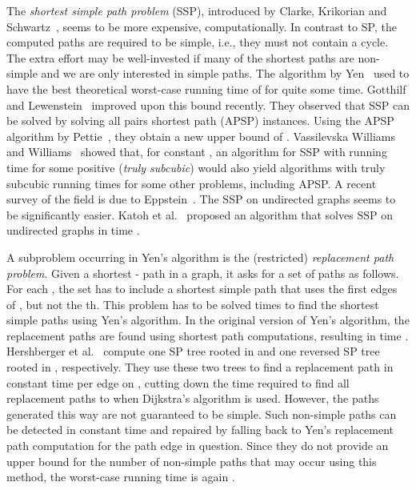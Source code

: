 \documentclass[runningheads,a4paper]{llncs}
\begin{document}
The \emph{ shortest simple path problem} (SSP), introduced by Clarke, Krikorian and Schwartz~\cite{CUSTOM:journals/jsiam/ClarkeKR63}, seems to be more expensive, computationally.
In contrast to SP, the computed paths are required to be simple, i.e., they must not contain a cycle.
The extra effort may be well-invested if many of the  shortest paths are non-simple and we are only interested in simple paths.
The algorithm by Yen~\cite{CUSTOM:journals/networks/Yen71} used to have the best theoretical worst-case running time of  for quite some time.
Gotthilf and Lewenstein~\cite{DBLP:journals/ipl/GotthilfL09} improved upon this bound recently.
They observed that SSP can be solved by solving  all pairs shortest path (APSP) instances.
Using the APSP algorithm by Pettie~\cite{DBLP:journals/tcs/Pettie04}, they obtain a new upper bound of .
Vassilevska Williams and Williams~\cite{DBLP:conf/focs/WilliamsW10} showed that, for constant , an algorithm for SSP with running time  for some positive  (\emph{truly subcubic}) would also yield algorithms with truly subcubic running times for some other problems, including APSP.
A recent survey of the field is due to Eppstein~\cite{CUSTOM:arxiv/Eppstein14}.
The SSP on undirected graphs seems to be significantly easier.
Katoh et al.~\cite{DBLP:journals/networks/KatohIM82} proposed an algorithm that solves SSP on undirected graphs in time .

A subproblem occurring in Yen's algorithm is the (restricted) \emph{replacement path problem}.
Given a shortest - path  in a graph, it asks for a set of paths as follows.
For each , the set has to include a shortest simple path that uses the first  edges of , but not the th.
This problem has to be solved  times to find the  shortest simple paths using Yen's algorithm.
In the original version of Yen's algorithm, the replacement paths are found using  shortest path computations, resulting in time .
Hershberger et al.~\cite{DBLP:journals/talg/HershbergerMS07} compute one SP tree rooted in  and one reversed SP tree rooted in , respectively.
They use these two trees to find a replacement path in constant time per edge on , cutting down the time required to find all replacement paths to  when Dijkstra's algorithm is used.
However, the paths generated this way are not guaranteed to be simple.
Such non-simple paths can be detected in constant time and repaired by falling back to Yen's replacement path computation for the path edge in question.
Since they do not provide an upper bound for the number of non-simple paths that may occur using this method, the worst-case running time is again .
\end{document}
